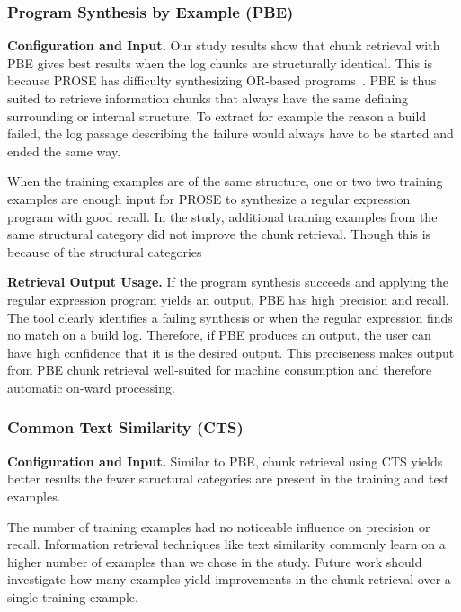 \subsubsection{Program Synthesis by Example (PBE)}

\noindent
\textbf{Configuration and Input.}
Our study results show that chunk retrieval with PBE gives best
results when the log chunks are structurally identical.
This is
because PROSE has difficulty synthesizing OR-based
programs~\cite{mayer2015user}.
PBE is thus suited to retrieve information
chunks that always have the same defining surrounding or internal
structure.
To extract for example the reason a build failed, the log
passage describing the failure would always have to be started and
ended the same way.

When the training examples are of the same structure, one or two
two training examples are enough input for PROSE to synthesize a regular
expression program with good recall.
In the study, additional training
examples from the same structural category
did not improve the chunk retrieval.
Though this is because of the structural categories

\noindent
\textbf{Retrieval Output Usage.}
If the program synthesis succeeds and applying the regular expression
program yields an output, PBE has high precision and recall.
The tool
clearly identifies a failing synthesis or when the regular expression
finds no match on a build log.
Therefore, if PBE produces
an output, the user can have high confidence that it is the desired
output.
This preciseness makes output from PBE chunk retrieval
well-suited for machine consumption and therefore automatic on-ward
processing.

\subsubsection{Common Text Similarity (CTS)}
\noindent
\textbf{Configuration and Input.}
Similar to PBE, chunk retrieval using CTS yields better results the
fewer structural categories are present in the training and test
examples.

The number of training examples had no noticeable influence on
precision or recall.
Information retrieval techniques
like text similarity commonly learn on a higher number of examples
than we chose in the study.
Future work should investigate how many
examples yield improvements in the chunk retrieval over a single
training example.

